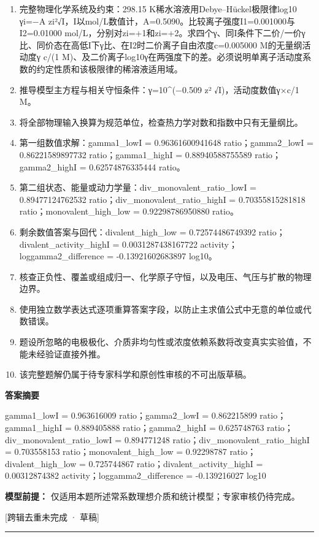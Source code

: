 \documentclass[UTF8,11pt,a4paper]{ctexart}
\begin{document}
\begin{enumerate}
\item 完整物理化学系统及约束：298.15 K稀水溶液用Debye–Hückel极限律log10 γi=−A zi²√I，I以mol/L数值计，A=0.5090。比较离子强度I1=0.001000与I2=0.01000 mol/L，分别对zi=+1和zi=+2。求四个γ、同I条件下二价/一价γ比、同价态在高低I下γ比、在I2时二价离子自由浓度c=0.005000 M的无量纲活动度γ c/(1 M)、及二价离子log10γ在两强度下的差。必须说明单离子活动度系数的约定性质和该极限律的稀溶液适用域。
\item 推导模型主方程与相关守恒条件：γ=10\textasciicircum{}(−0.509 z² √I)，活动度数值γ×c/1 M。
\item 将全部物理输入换算为规范单位，检查热力学对数和指数中只有无量纲比。
\item 第一组数值求解：gamma1\_lowI = 0.96361600941648 ratio；gamma2\_lowI = 0.86221589897732 ratio；gamma1\_highI = 0.88940588755589 ratio；gamma2\_highI = 0.62574876335444 ratio。
\item 第二组状态、能量或动力学量：div\_monovalent\_ratio\_lowI = 0.89477124762532 ratio；div\_monovalent\_ratio\_highI = 0.70355815281818 ratio；monovalent\_high\_low = 0.92298786950880 ratio。
\item 剩余数值答案与回代：divalent\_high\_low = 0.72574486749392 ratio；divalent\_activity\_highI = 0.0031287438167722 activity；loggamma2\_difference = -0.13921602683897 log10。
\item 核查正负性、覆盖或组成归一、化学原子守恒，以及电压、气压与扩散的物理边界。
\item 使用独立数学表达式逐项重算答案字段，以防止主求值公式中无意的单位或代数错误。
\item 题设所忽略的电极极化、介质非均匀性或浓度依赖系数将改变真实实验值，不能未经验证直接外推。
\item 该完整题解仍属于待专家科学和原创性审核的不可出版草稿。
\end{enumerate}
\noindent\textbf{答案摘要}\par
gamma1\_lowI = 0.963616009 ratio；gamma2\_lowI = 0.862215899 ratio；gamma1\_highI = 0.889405888 ratio；gamma2\_highI = 0.625748763 ratio；div\_monovalent\_ratio\_lowI = 0.894771248 ratio；div\_monovalent\_ratio\_highI = 0.703558153 ratio；monovalent\_high\_low = 0.92298787 ratio；divalent\_high\_low = 0.725744867 ratio；divalent\_activity\_highI = 0.00312874382 activity；loggamma2\_difference = -0.139216027 log10\par
\noindent\textbf{模型前提：}
仅适用本题所述常系数理想介质和统计模型；专家审核仍待完成。\par
\noindent\textcolor{red!65!black}{[跨辑去重未完成 · 草稿]} \par
\medskip\hrule\medskip
{}
\end{document}
